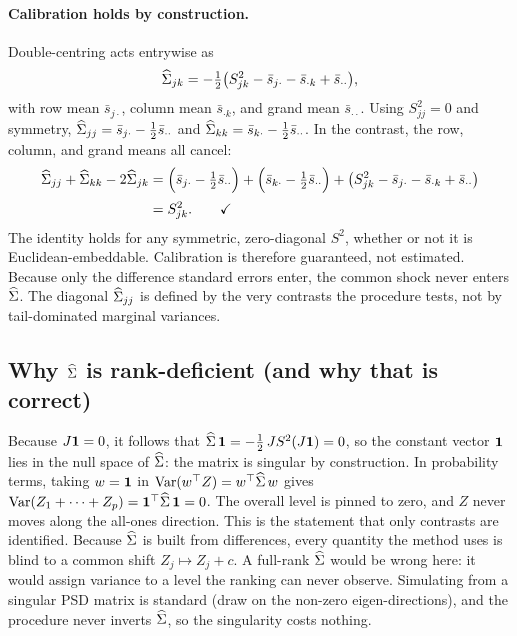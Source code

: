 \paragraph{Calibration holds by construction.}
Double-centring acts entrywise as
\begin{equation}
  \widehat{\Sigma}_{jk}
  = -\tfrac12\big(S^2_{jk} - \bar{s}_{j\cdot} - \bar{s}_{\cdot k}
      + \bar{s}_{\cdot\cdot}\big),
\end{equation}
with row mean $\bar{s}_{j\cdot}$, column mean $\bar{s}_{\cdot k}$, and grand mean
$\bar{s}_{\cdot\cdot}$. Using $S^2_{jj}=0$ and symmetry,
$\widehat{\Sigma}_{jj}=\bar{s}_{j\cdot}-\tfrac12\bar{s}_{\cdot\cdot}$ and
$\widehat{\Sigma}_{kk}=\bar{s}_{k\cdot}-\tfrac12\bar{s}_{\cdot\cdot}$. In the contrast, the row,
column, and grand means all cancel:
\begin{align}
  \widehat{\Sigma}_{jj} + \widehat{\Sigma}_{kk} - 2\widehat{\Sigma}_{jk}
  &= \Big(\bar{s}_{j\cdot} - \tfrac12\bar{s}_{\cdot\cdot}\Big)
   + \Big(\bar{s}_{k\cdot} - \tfrac12\bar{s}_{\cdot\cdot}\Big)
   + \big(S^2_{jk} - \bar{s}_{j\cdot} - \bar{s}_{\cdot k}
          + \bar{s}_{\cdot\cdot}\big) \notag\\[2pt]
  &= S^2_{jk}. \qquad\checkmark
\end{align}
The identity holds for any symmetric, zero-diagonal $S^2$, whether or not it is
Euclidean-embeddable. Calibration is therefore guaranteed, not estimated. Because only
the difference standard errors enter, the common shock never enters $\widehat{\Sigma}$. The diagonal
$\widehat{\Sigma}_{jj}$ is defined by the very contrasts the procedure tests, not by tail-dominated
marginal variances.

\subsection{Why $\widehat{\Sigma}$ is rank-deficient (and why that is correct)}

Because $J\mathbf{1} = 0$, it follows that $\widehat{\Sigma}\,\mathbf{1} = -\tfrac12\, J S^2 (J\mathbf{1}) = 0$, so the
constant vector $\mathbf{1}$ lies in the null space of $\widehat{\Sigma}$: the matrix is singular by
construction. In probability terms, taking $w=\mathbf{1}$ in $\operatorname{Var}(w^\top Z)=w^\top\widehat{\Sigma}\,w$
gives $\operatorname{Var}(Z_1+\dots+Z_p)=\mathbf{1}^\top\widehat{\Sigma}\,\mathbf{1}=0$. The overall level is pinned to zero,
and $Z$ never moves along the all-ones direction. This is the statement that only
contrasts are identified. Because $\widehat{\Sigma}$ is built from differences, every quantity the
method uses is blind to a common shift $Z_j \mapsto Z_j + c$. A full-rank $\widehat{\Sigma}$ would be
wrong here: it would assign variance to a level the ranking can never observe.
Simulating from a singular PSD matrix is standard (draw on the non-zero
eigen-directions), and the procedure never inverts $\widehat{\Sigma}$, so the singularity costs
nothing.

